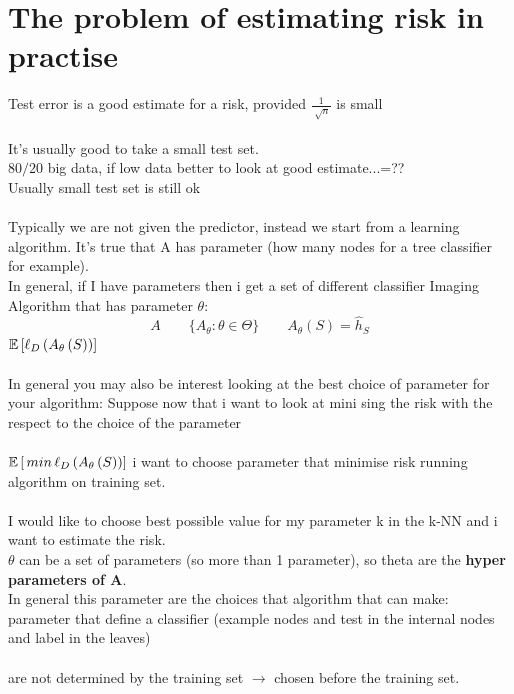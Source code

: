 \documentclass[../main.tex]{subfiles}
\begin{document}
\section{The problem of estimating risk in practise}
Test error is a good estimate for a risk, provided $\frac{1}{\sqrt[]{n}}$ is small\\\\
It’s usually good to take a small test set.\\
$80/20$ big data, if low data better to look at good estimate...=??\\
Usually small test set is still ok\\\\
Typically we are not given the predictor, instead we start from a learning
algorithm. It’s true that A has parameter (how many nodes for a tree classifier
for example).\\
In general, if I have parameters then i get a set of different classifier
Imaging Algorithm that has parameter $\theta$:
$$ 
A \qquad  \{ A_{\theta}: \theta \in \Theta \} \qquad
A_{\theta} \left(S\right) = \hat{h}_S
$$
$\mathbb{E} \left[ \ell_D \left( A_\theta \left(S \right) \right) \right]
$ \qquad {}
\\\\In general you may also be interest looking at the best choice of parameter for
your algorithm:
Suppose now that i want to look at mini sing the risk with the respect to the
choice of the parameter\\\\
$\mathbb{E} \left[ \, min \, \ell_D \left( A_\theta \left(S \right) \right) \right]
$ \quad i want to choose parameter that minimise risk running algorithm on training set.
\\\\
I would like to choose best possible value for my parameter k in the k-NN and
i want to estimate the risk.\\
$\theta$ can be a set of parameters (so more than 1 parameter), so theta are
the \textbf{hyper parameters of A}.\\
In general this parameter are the choices that algorithm that can make:
parameter that define a classifier (example nodes and test in the internal
nodes and label in the leaves)\\\\
 are not determined by the training set $\rightarrow$ chosen
before the training set.\\
\end{document}
